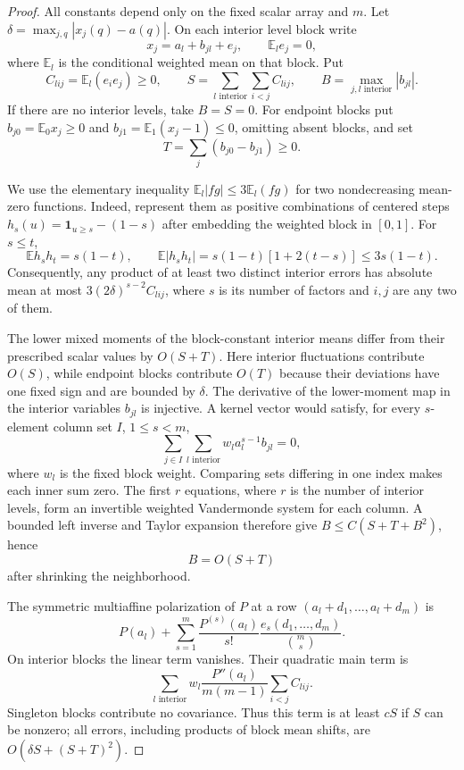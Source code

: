 \documentclass[11pt]{article}
\newcommand{\E}{\mathbb E}
\begin{document}
\begin{proof}
All constants depend only on the fixed scalar array and $m$.
Let $\delta=\max_{j,q}|x_j(q)-a(q)|$.
On each interior level block write
\[
 x_j=a_l+b_{jl}+e_j,\qquad \E_l e_j=0,
\]
where $\E_l$ is the conditional weighted mean on that block. Put
\[
 C_{lij}=\E_l(e_i e_j)\ge0,
 \qquad S=\sum_{l\text{ interior}}\sum_{i<j}C_{lij},
 \qquad B=\max_{j,l\text{ interior}}|b_{jl}|.
\]
If there are no interior levels, take $B=S=0$.
For endpoint blocks put $b_{j0}=\E_0 x_j\ge0$ and
$b_{j1}=\E_1(x_j-1)\le0$, omitting absent blocks, and set
\[
 T=\sum_j(b_{j0}-b_{j1})\ge0.
\]

We use the elementary inequality
$\E_l|fg|\le3\E_l(fg)$ for two nondecreasing mean-zero functions.
Indeed, represent them as positive combinations of centered steps
$h_s(u)=\mathbf1_{u\ge s}-(1-s)$ after embedding the weighted block
in $[0,1]$. For $s\le t$,
\[
 \E h_s h_t=s(1-t),\qquad
 \E|h_s h_t|=s(1-t)[1+2(t-s)]\le3s(1-t).
\]
Consequently, any product of at least two distinct interior errors
has absolute mean at most $3(2\delta)^{s-2}C_{lij}$, where $s$ is
its number of factors and $i,j$ are any two of them.

The lower mixed moments of the block-constant interior means differ
from their prescribed scalar values by $O(S+T)$. Here interior
fluctuations contribute $O(S)$, while endpoint blocks contribute
$O(T)$ because their deviations have one fixed sign and are bounded
by $\delta$.
The derivative of the lower-moment map in the interior variables
$b_{jl}$ is injective. A kernel vector would satisfy, for every
$s$-element column set $I$, $1\le s<m$,
\[
 \sum_{j\in I}\sum_{l\text{ interior}} w_l a_l^{s-1}b_{jl}=0,
\]
where $w_l$ is the fixed block weight. Comparing sets differing in one
index makes each inner sum zero. The first $r$ equations, where $r$
is the number of interior levels, form an invertible weighted
Vandermonde system for each column. A bounded left inverse and Taylor
expansion therefore give
$B\le C(S+T+B^2)$, hence
\[
 B=O(S+T)
\]
after shrinking the neighborhood.

The symmetric multiaffine polarization of $P$ at a row
$(a_l+d_1,\ldots,a_l+d_m)$ is
\[
 P(a_l)+\sum_{s=1}^m\frac{P^{(s)}(a_l)}{s!}
                  \frac{e_s(d_1,\ldots,d_m)}{\binom ms}.
\]
On interior blocks the linear term vanishes. Their quadratic main
term is
\[
 \sum_{l\text{ interior}} w_l\frac{P''(a_l)}{m(m-1)}
                    \sum_{i<j}C_{lij}.
\]
Singleton blocks contribute no covariance. Thus this term is at least
$cS$ if $S$ can be nonzero; all errors, including products of block
mean shifts, are $O(\delta S+(S+T)^2)$.


\end{proof}
\end{document}
